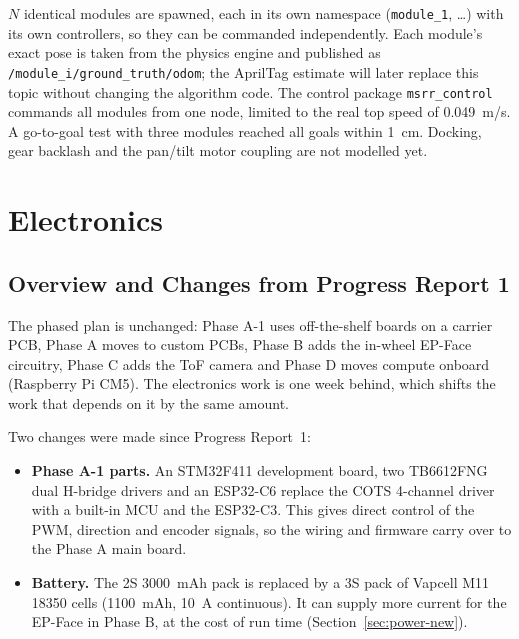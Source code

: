 \documentclass[12pt,a4paper]{article}
\begin{document}
$N$ identical modules are spawned, each in its own namespace (\texttt{module\_1}, \ldots) with its own controllers, so they can be commanded independently. Each module's exact pose is taken from the physics engine and published as \texttt{/module\_i/ground\_truth/odom}; the AprilTag estimate will later replace this topic without changing the algorithm code. The control package \texttt{msrr\_control} commands all modules from one node, limited to the real top speed of \SI{0.049}{m/s}. A go-to-goal test with three modules reached all goals within \SI{1}{cm}. Docking, gear backlash and the pan/tilt motor coupling are not modelled yet.

\clearpage
\section{Electronics}
\label{sec:electronics}

\subsection{Overview and Changes from Progress Report 1}
\label{sec:elec-overview}

The phased plan is unchanged: Phase A-1 uses off-the-shelf boards on a carrier PCB, Phase A moves to custom PCBs, Phase B adds the in-wheel EP-Face circuitry, Phase C adds the ToF camera and Phase D moves compute onboard (Raspberry Pi CM5). The electronics work is one week behind, which shifts the work that depends on it by the same amount.

Two changes were made since Progress Report~1:
\begin{itemize}
  \item \textbf{Phase A-1 parts.} An STM32F411 development board, two TB6612FNG dual H-bridge drivers and an ESP32-C6 replace the COTS 4-channel driver with a built-in MCU and the ESP32-C3. This gives direct control of the PWM, direction and encoder signals, so the wiring and firmware carry over to the Phase A main board.
  \item \textbf{Battery.} The 2S \SI{3000}{mAh} pack is replaced by a 3S pack of Vapcell M11 18350 cells (\SI{1100}{mAh}, \SI{10}{A} continuous). It can supply more current for the EP-Face in Phase B, at the cost of run time (Section~\ref{sec:power-new}).
\end{itemize}

\end{document}
